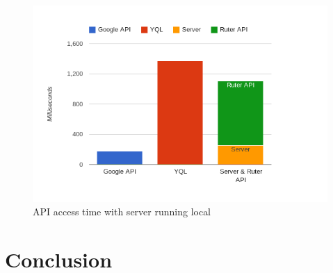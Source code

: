 \documentclass[10pt,a4paper]{article}
\begin{document}
\begin{figure}
\centering
\includegraphics[width=\textwidth]{../apitimes/apitiderLocalhost}
\caption{API access time with server running local}
\label{time_localhost}
\end{figure}

\section{Conclusion}
\end{document}
